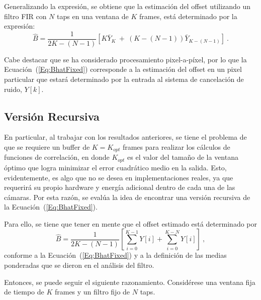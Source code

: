 Generalizando la expresión, se obtiene que la estimación del offset utilizando un filtro \ac{FIR} con $N$ taps en una ventana de $K$ frames, está determinado por la expresión:
\begin{equation}
 \hat{B} = \frac{1}{2K-(N-1)}\left[K\bar{Y}_{K} ~+~ (K-(N-1))\bar{Y}_{K-(N-1)}\right]~.
\label{Eq:BhatFixed}
\end{equation}

Cabe destacar que se ha considerado procesamiento pixel-a-píxel, por lo que la Ecuación~(\ref{Eq:BhatFixed}) corresponde a la estimación del offset en un pixel particular que estará determinado por la entrada al sistema de cancelación de ruido, $Y[k]$.

\subsection{Versión Recursiva}
En particular, al trabajar con los resultados anteriores, se tiene el problema de que se requiere un buffer de $K=K_{opt}$ frames para realizar los cálculos de funciones de correlación, en donde $K_{opt}$ es el valor del tamaño de la ventana óptimo que logra minimizar el error cuadrático medio en la salida. Esto, evidentemente, es algo que no se desea en implementaciones reales, ya que requerirá su propio hardware y energía adicional dentro de cada una de las cámaras. Por esta razón, se evalúa la idea de encontrar una versión recursiva de la Ecuación~(\ref{Eq:BhatFixed}). 

Para ello, se tiene que tener en mente que el offset estimado está determinado por 
$$\hat{B} = \frac{1}{2K-(N-1)}\left[ \sum_{i=0}^{K-1}Y[i] + \sum_{i=0}^{K-N}Y[i] \right]~,$$
conforme a la Ecuación~(\ref{Eq:BhatFixed}) y a la definición de las medias ponderadas que se dieron en el análisis del filtro.

Entonces, se puede seguir el siguiente razonamiento. Considérese una ventana fija de tiempo de $K$ frames y un filtro fijo de $N$ taps. 


